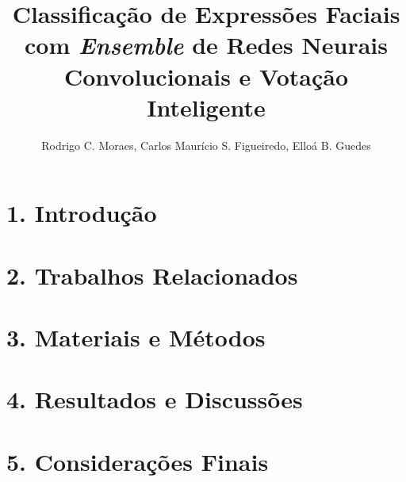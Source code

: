 \documentclass[12pt]{article}
\title{Classificação de Expressões Faciais com \emph{Ensemble} de Redes Neurais Convolucionais e Votação Inteligente}
\author{Rodrigo C. Moraes, Carlos Maurício S. Figueiredo, Elloá B. Guedes}
\begin{document}
\maketitle




\section{1. Introdução}


\section{2. Trabalhos Relacionados}


\section{3. Materiais e Métodos}


\section{4. Resultados e Discussões}


\section{5. Considerações Finais}




\end{document}
